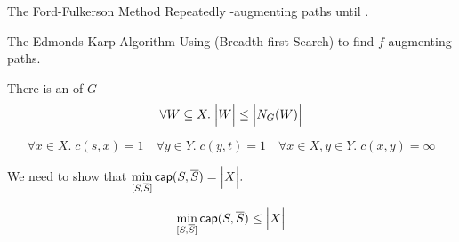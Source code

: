 \begin{frame}{}
  \begin{exampleblock}{The Ford-Fulkerson Method}
    Repeatedly  -augmenting paths
    until .
  \end{exampleblock}

  \vspace{0.50cm}
\end{frame}

\begin{frame}{}
  \begin{exampleblock}{The Edmonds-Karp Algorithm}
    Using  (Breadth-first Search) to find $f$-augmenting paths.
  \end{exampleblock}

  \vspace{0.50cm}
\end{frame}

\begin{frame}{}
  \begin{theorem}
    There is an  of $G$ 
    \[
      \forall W \subseteq X.\; \Big\lvert W \Big\rvert \le \Big\lvert N_{G}(W) \Big\rvert
    \]
  \end{theorem}

  \pause
  \[
    \forall x \in X.\; c(s, x) = 1 \quad \forall y \in Y.\; c(y, t) = 1
    \quad \forall x \in X, y \in Y.\; c(x, y) = \infty
  \]

  \pause
  \begin{center}
  \end{center}
\end{frame}

\begin{frame}{}
  \begin{center}
    We need to show that
    $\min\limits_{[S, \overline{S}]} \textsf{cap}(S, \overline{S}) = \Big\lvert X \Big\rvert.$
  \end{center}

  \pause
  \[
    \min\limits_{[S, \overline{S}]} \textsf{cap}(S, \overline{S}) \le \Big\lvert X \Big\rvert
  \]

  \pause
  \begin{center}
  \end{center}
\end{frame}

